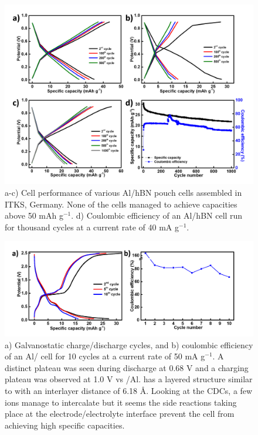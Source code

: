\begin{figure}[tbh!]
\centering
\includegraphics[width=\textwidth]{Figures/appendix/pouchcellCDCCE}
\caption{a-c) Cell performance of various Al/hBN pouch cells assembled in ITKS, Germany. None of the cells managed to achieve capacities above 50 mAh g$^{-1}$. d) Coulombic efficiency of an Al/hBN cell run for thousand cycles at a current rate of 40 mA g$^{-1}$. }
\label{Figures/appendix:pouchcellCDCCE}
\end{figure}
\begin{figure}[tbh!]
\centering
\includegraphics[width=\textwidth]{Figures/appendix/WS2CDCCE}
\caption{ a) Galvanostatic charge/discharge cycles, and b) coulombic efficiency of an Al/ cell for 10 cycles at a current rate of 50 mA g$^{-1}$. A distinct plateau was seen during discharge at 0.68 V and a charging plateau was observed at 1.0 V vs /Al.  has a layered structure similar to  with an interlayer distance of 6.18 \AA. Looking at the CDCs, a few  ions manage to intercalate but it seems the side reactions taking place at the electrode/electrolyte interface prevent the cell from achieving high specific capacities.}
\label{Figures/appendix:WS2CDCCE}
\end{figure}
